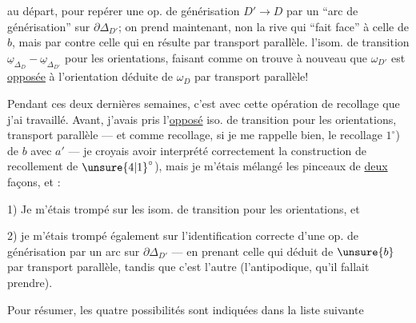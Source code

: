 au départ, pour repérer une op. de générisation $D'\longrightarrow D$ par un ``arc de  générisation'' sur $\partial\Delta_{D'}$; on prend maintenant, non la rive qui ``fait face'' à celle de $b$, mais par contre celle qui en résulte par transport parallèle.   l'isom. de transition $\underline\omega_{\Delta_D}\mathbin{-}\underline\omega_{\Delta_{D'}}$ pour les orientations, faisant comme 
on trouve à nouveau que $\omega_{D'}$ est \uline{opposée} à l'orientation  déduite de $\omega_D$ par transport parallèle!

Pendant ces deux dernières semaines, c'est avec cette opération de recollage que j'ai travaillé. Avant, j'avais pris  l'\uline{opposé} iso. de transition pour les orientations,  transport parallèle ---  et comme  recollage, si je me rappelle bien, le recollage
$1^\circ$) de $b$ avec $a'$ --- je croyais avoir interprété correctement la construction de recollement de $\unsure{4|1}^\circ$), mais je m'étais mélangé les pinceaux de \uline{deux} façons, et :

1) Je m'étais trompé sur les isom. de transition pour les orientations, et

2) je m'étais trompé également sur l'identification correcte d'une op. de générisation  par un arc sur $\partial\Delta_{D'}$ --- en prenant  celle qui   déduit de $\unsure{b}$ par transport parallèle, tandis que c'est l'autre  (l'antipodique, qu'il fallait prendre).

Pour résumer, les quatre possibilités sont indiquées dans la liste suivante
